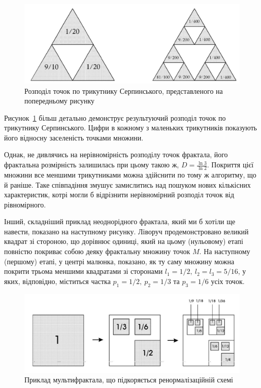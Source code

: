 \documentclass[
  letterpaper,
]{report}
\begin{document}
\begin{figure}

{\centering 

\includegraphics{Images/lab_7/distribution_of_points.jpg}

}

\caption{\label{fig-dist-serp}Розподіл точок по трикутнику Серпинського,
представленого на попередньому рисунку}

\end{figure}

Рисунок~\ref{fig-dist-serp} більш детально демонструє результуючий
розподіл точок по трикутнику Серпинського. Цифри в кожному з маленьких
трикутників показують його відносну заселеність точками множини.

Однак, не дивлячись на нерівномірність розподілу точок фрактала, його
фрактальна розмірність залишилась при цьому такою ж,
\(D=\frac{\ln{3}}{\ln{2}}\). Покриття цієї множини все меншими
трикутниками можна здійснити по тому ж алгоритму, що й раніше. Таке
співпадіння змушує замислитись над пошуком нових кількісних
характеристик, котрі могли б відрізнити нерівномірний розподіл точок від
рівномірного.

Інший, складніший приклад неоднорідного фрактала, який ми б хотіли ще
навести, показано на наступному рисунку. Ліворуч продемонстровано
великий квадрат зі стороною, що дорівнює одиниці, який на цьому
(нульовому) етапі повністю покриває собою деяку фрактальну множину точок
\(M\). На наступному (першому) етапі, у центрі малюнка, показано, як ту
саму множину можна покрити трьома меншими квадратами зі сторонами
\(l_1=1/2, \ l_2=l_3=5/16\), у яких, відповідно, міститься частка
\(p_1=1/2, \ p_2=1/3\) та \(p_3=1/6\) усіх точок.

\begin{figure}

{\centering 

\includegraphics{Images/lab_7/square_fractal.jpg}

}

\caption{\label{fig-dist-square}Приклад мультифрактала, що підкоряється
ренормалізаційній схемі}

\end{figure}
\end{document}
